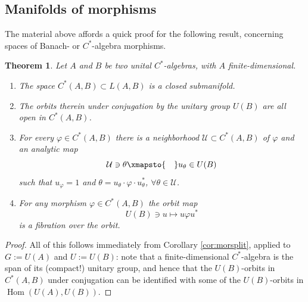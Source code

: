\documentclass[10pt,a4paper]{amsart}
\numberwithin{equation}{section}
\newtheorem{Theorem}{Theorem}[section]
\newcommand\cU{{\mathcal U}}
\DeclareMathOperator{\Hom}{\mathrm{Hom}}
\begin{document}
\subsection{Manifolds of morphisms}\label{subse:manmor}

The material above affords a quick proof for the following result, concerning spaces of Banach- or $C^*$-algebra morphisms.


\begin{Theorem}\label{th:castmorcross}
 Let $A$ and $B$ be two unital $C^*$-algebras, with $A$ finite-dimensional.
 \begin{enumerate}[$(1)$]\itemsep=0pt
 \item The space $C^*(A,B)\subset L(A,B)$ is a closed submanifold.
 \item\label{item:a2brefreport} The orbits therein under conjugation by the unitary group $U(B)$ are all open in $C^*(A,B)$.
 \item\label{item:castcross} For every $\varphi\in C^*(A,B)$ there is a neighborhood $\cU\subset C^*(A,B)$ of $\varphi$ and an analytic map
 \begin{equation*}
 \cU\ni \theta\xmapsto{\quad}u_{\theta}\in U(B)
 \end{equation*}
 such that $u_{\varphi}=1$ and $\theta = u_{\theta}\cdot \varphi\cdot u_{\theta}^*$, $\forall \theta\in \cU$.
 \item For any morphism $\varphi\in C^*(A,B)$ the orbit map
 \[U(B)\ni u\mapsto u\varphi u^*\] is a fibration over the orbit.



 \end{enumerate}
\end{Theorem}
\begin{proof}
 All of this follows immediately from Corollary \ref{cor:morsplit}, applied to $G:=U(A)$ and $U:=U(B)$: note that a finite-dimensional $C^*$-algebra is the span of its (compact!) unitary group, and hence that the $U(B)$-orbits in $C^*(A,B)$ under conjugation can be identified with some of the $U(B)$-orbits in $\Hom(U(A), U(B))$.
\end{proof}
\end{document}
